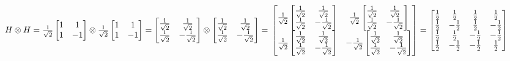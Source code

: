 \documentclass[11pt, fleqn]{article}
\begin{document}
$H\otimes H = 
\frac{1}{\sqrt 2}\begin{bmatrix}1&1\\1&-1\end{bmatrix}\otimes
\frac{1}{\sqrt 2}\begin{bmatrix}1&1\\1&-1\end{bmatrix} =
\begin{bmatrix}\frac{1}{\sqrt 2}&\frac{1}{\sqrt 2}\\\frac{1}{\sqrt 2}&-\frac{1}{\sqrt 2}\end{bmatrix}\otimes
\begin{bmatrix}\frac{1}{\sqrt 2}&\frac{1}{\sqrt 2}\\\frac{1}{\sqrt 2}&-\frac{1}{\sqrt 2}\end{bmatrix}=
\\~\\
\begin{bmatrix}\frac{1}{\sqrt 2}\begin{bmatrix}\frac{1}{\sqrt 2}&\frac{1}{\sqrt 2}\\\frac{1}{\sqrt 2}&-\frac{1}{\sqrt 2}\end{bmatrix}&\frac{1}{\sqrt 2}\begin{bmatrix}\frac{1}{\sqrt 2}&\frac{1}{\sqrt 2}\\\frac{1}{\sqrt 2}&-\frac{1}{\sqrt 2}\end{bmatrix}\\\frac{1}{\sqrt 2}\begin{bmatrix}\frac{1}{\sqrt 2}&\frac{1}{\sqrt 2}\\\frac{1}{\sqrt 2}&-\frac{1}{\sqrt 2}\end{bmatrix}&-\frac{1}{\sqrt 2}\begin{bmatrix}\frac{1}{\sqrt 2}&\frac{1}{\sqrt 2}\\\frac{1}{\sqrt 2}&-\frac{1}{\sqrt 2}\end{bmatrix}\end{bmatrix}=
\begin{bmatrix}
\frac{1}{2}&\frac{1}{2}&\frac{1}{2}&\frac{1}{2}\\
\frac{1}{2}&-\frac{1}{2}&\frac{1}{2}&-\frac{1}{2}\\
\frac{1}{2}&\frac{1}{2}&-\frac{1}{2}&-\frac{1}{2}\\
\frac{1}{2}&-\frac{1}{2}&-\frac{1}{2}&\frac{1}{2}\\
\end{bmatrix}
\\~\\$
\end{document}
